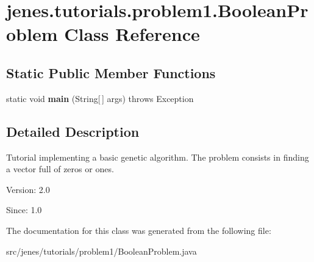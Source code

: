 \hypertarget{classjenes_1_1tutorials_1_1problem1_1_1_boolean_problem}{
\section{jenes.tutorials.problem1.BooleanProblem Class Reference}
\label{classjenes_1_1tutorials_1_1problem1_1_1_boolean_problem}
}
\subsection*{Static Public Member Functions}
\begin{CompactItemize}
\item 
\hypertarget{classjenes_1_1tutorials_1_1problem1_1_1_boolean_problem_04df83435bdce30ece47f2407f186d14}{
static void \textbf{main} (String\mbox{[}$\,$\mbox{]} args)  throws Exception }
\label{classjenes_1_1tutorials_1_1problem1_1_1_boolean_problem_04df83435bdce30ece47f2407f186d14}

\end{CompactItemize}


\subsection{Detailed Description}
Tutorial implementing a basic genetic algorithm. The problem consists in finding a vector full of zeros or ones.

\begin{Desc}
\item[Version:]2.0 \end{Desc}
\begin{Desc}
\item[Since:]1.0 \end{Desc}


The documentation for this class was generated from the following file:\begin{CompactItemize}
\item 
src/jenes/tutorials/problem1/BooleanProblem.java\end{CompactItemize}
